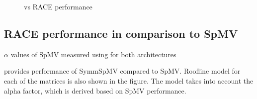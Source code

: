 \begin{figure}[thbp]
	\centering
	\hspace{1em}
	\caption{\SpMV vs RACE \SymmSpmv performance}
	\label{fig:SpMV_vs_SymmSpMV}
\end{figure}
\subsection{RACE performance in comparison to SpMV}
\begin{table}[ht]
	\footnotesize
	\caption{$\alpha$ values of SpMV measured using \LIKWID for both architectures }
	\label{table:alpha_values}
	\begin{center}
		
	\end{center}
\end{table}

 provides performance of SymmSpMV compared to SpMV. Roofline \cite{Williams_roofline} model for each of the matrices is also shown in the figure. The model takes into account the alpha factor, which is derived based on SpMV performance.


